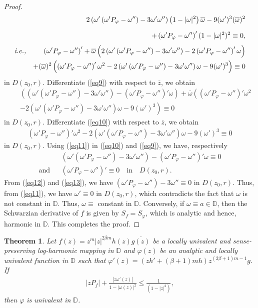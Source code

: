 \documentclass[12pt,reqno]{amsart}
\newtheorem{thm}{Theorem}[section]
\newtheorem{open problem}{Open problem}[section]
\newcommand{\ol}{\overline}
\newcommand{\bea}{\begin{eqnarray}}
\newcommand{\eea}{\end{eqnarray}}
\renewcommand{\phi}{\varphi}
\numberwithin{equation}{section}
\begin{document}
\begin{proof}
\bea &&2\left(\omega'\left(\omega' P_\phi-\omega''\right)-3\omega'\omega''\right)\left(1-|\omega|^2\right)\ol{\omega}-9(\omega')^3(\ol{\omega})^2\nonumber\\[2mm]
&&+\left(\omega' P_\phi-\omega''\right)'(1-|\omega|^2)^2\equiv 0,\nonumber\\[1mm]\text{\it i.e.,}
&&\left(\omega' P_\phi-\omega''\right)'+\ol{\omega}\left(2\left(\omega'\left(\omega' P_\phi-\omega''\right)-3\omega'\omega''\right)-2\left(\omega' P_\phi-\omega''\right)'\omega\right)\nonumber\\
\label{eq9}&&+(\ol{\omega})^2\left(\left(\omega' P_\phi-\omega''\right)'\omega^2-2\left(\omega'\left(\omega' P_\phi-\omega''\right)-3\omega'\omega''\right)\omega-9(\omega')^3\right)\equiv 0\nonumber\\\eea
in $D(z_0, r)$. Differentiate (\ref{eq9}) with respect to $\ol{z}$, we obtain
\bea\label{eq10} &&\left(\left(\omega'\left(\omega' P_\phi-\omega''\right)-3\omega'\omega''\right)-\left(\omega' P_\phi-\omega''\right)'\omega\right)+\ol{\omega}\left(\left(\omega' P_\phi-\omega''\right)'\omega^2\right.\nonumber\\
&&\left.-2\left(\omega'\left(\omega' P_\phi-\omega''\right)-3\omega'\omega''\right)\omega-9(\omega')^3\right)\equiv 0\eea
in $D(z_0, r)$. Differentiate (\ref{eq10}) with respect to $\ol{z}$, we obtain
\bea\label{eq11}\left(\omega' P_\phi-\omega''\right)'\omega^2-2\left(\omega'\left(\omega' P_\phi-\omega''\right)-3\omega'\omega''\right)\omega-9(\omega')^3\equiv 0\eea
in $D(z_0, r)$. Using (\ref{eq11}) in (\ref{eq10}) and (\ref{eq9}), we have, respectively 
\bea\label{eq12}&&\left(\omega'\left(\omega' P_\phi-\omega''\right)-3\omega'\omega''\right)-\left(\omega' P_\phi-\omega''\right)'\omega\equiv 0\\\text{and}
\label{eq13}&&\left(\omega' P_\phi-\omega''\right)'\equiv 0\quad\text{in}\quad D(z_0,r).\eea
From (\ref{eq12}) and (\ref{eq13}), we have $\left(\omega' P_\phi-\omega''\right)-3\omega''\equiv 0$ in $D(z_0,r)$. Thus, from (\ref{eq11}), we have $\omega'\equiv 0$ in 
$D(z_0,r)$, which contradicts the fact that $\omega$ is not constant in $\mathbb{D}$. 
Thus, $\omega\equiv$ constant in $\mathbb{D}$. Conversely, if $\omega\equiv a\in\mathbb{D}$, then the Schwarzian derivative of $f$ is given by 
$S_f=S_\phi$, which is analytic and hence, harmonic in $\mathbb{D}$. This completes the proof.
\end{proof}
\begin{thm}
Let $f(z)=z^m|z|^{2\beta m} h(z)\ol{g(z)}$ be a locally univalent and sense-preserving log-harmonic mapping in $\mathbb{D}$ and $\phi(z)$ be an analytic and locally univalent function in $\mathbb{D}$ such that $\phi'(z)=(zh'+(\beta+1)m h)z^{(2\beta+1)m-1}g$.  If 
\bea\label{r2} |z P_{f}|+\frac{|z \omega'(z)|}{1-|\omega(z)|^2}\leq \frac{1}{(1-|z|^2)},\eea
 then $\phi$ is univalent in $\mathbb{D}$.
\end{thm}
\end{document}
